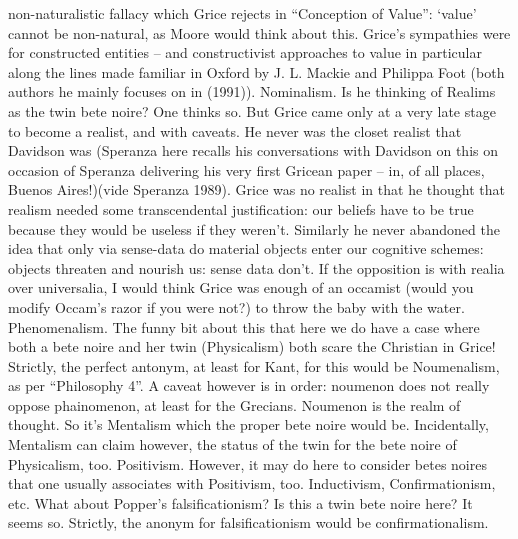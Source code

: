 \documentclass[10pt,titlepage]{book}
\begin{document}
non-naturalistic fallacy which Grice  rejects in “Conception of Value”: ‘value’ cannot 
be non-natural, as Moore would  think about this. Grice’s sympathies were for 
constructed entities – and  constructivist approaches to value in 
particular along the lines made familiar  in Oxford by J. L. Mackie and Philippa Foot 
(both authors he mainly focuses on  in (1991)). 
Nominalism. Is he  thinking of Realims as the twin bete noire? One thinks 
so. But Grice came only  at a very late stage to become a realist, and with 
caveats. He never was the  closet realist that Davidson was (Speranza here 
recalls his conversations with  Davidson on this on occasion of Speranza 
delivering his very first Gricean paper  – in, of all places, Buenos Aires!)(vide 
Speranza 1989). Grice was no realist in  that he thought that realism 
needed some transcendental justification: our  beliefs have to be true because 
they would be useless if they weren’t. Similarly  he never abandoned the idea 
that only via sense-data do material objects enter  our cognitive schemes: 
objects threaten and nourish us: sense data don’t. If the  opposition is with 
realia over universalia, I would think Grice was enough of an  occamist 
(would you modify Occam’s razor if you were not?) to throw the baby  with the 
water. 
Phenomenalism. The  funny bit about this that here we do have a case where 
both a bete noire and her  twin (Physicalism) both scare the Christian in 
Grice! Strictly, the perfect  antonym, at least for Kant, for this would be 
Noumenalism, as per “Philosophy  4”. A caveat however is in order: noumenon 
does not really oppose phainomenon,  at least for the Grecians. Noumenon is 
the realm of thought. So it’s Mentalism  which the proper bete noire would 
be. Incidentally, Mentalism can claim however,  the status of the twin for the 
bete noire of Physicalism,  too. 
Positivism.  However, it may do here to consider  betes noires that one 
usually associates with Positivism, too. Inductivism,  Confirmationism, etc. 
What about Popper’s falsificationism? Is this a twin bete  noire here? It 
seems so. Strictly, the anonym for falsificationism would be  confirmationalism. 
 
\end{document}
